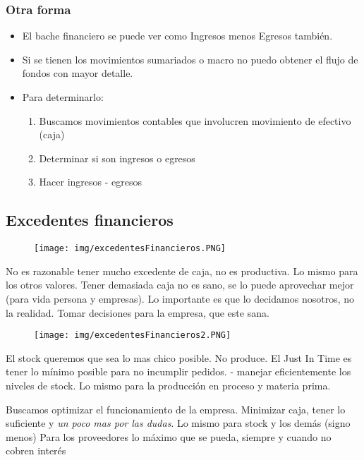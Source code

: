 \documentclass[titlepage,a4paper]{article}
\begin{document}
\subsubsection*{Otra forma}
\begin{itemize}
    \item El bache financiero se puede ver como Ingresos menos Egresos también.
    \item Si se tienen los movimientos sumariados o macro no puedo obtener el flujo de fondos con mayor detalle.
    \item Para determinarlo:
    \begin{enumerate}
        \item Buscamos movimientos contables que involucren movimiento de efectivo (caja)
        \item Determinar si son ingresos o egresos
        \item Hacer ingresos - egresos
    \end{enumerate}
\end{itemize}


\newpage
\subsection{Excedentes financieros}

\begin{figure}[!htb]
    \centering
    \texttt{[image: img/excedentesFinancieros.PNG]}
\end{figure}

No es razonable tener mucho excedente de caja, no es productiva. Lo mismo para los otros valores. 
Tener demasiada caja no es sano, se lo puede aprovechar mejor (para vida persona y empresas).
Lo importante es que lo decidamos nosotros, no la realidad. Tomar decisiones para la empresa, que este sana.

\begin{figure}[!htb]
    \centering
    \texttt{[image: img/excedentesFinancieros2.PNG]}
\end{figure}


El stock queremos que sea lo mas chico posible. No produce.
El Just In Time es tener lo mínimo posible para no incumplir pedidos. - manejar eficientemente los niveles de stock.
Lo mismo para la producción en proceso y materia prima.

Buscamos optimizar el funcionamiento de la empresa.
Minimizar caja, tener lo suficiente y \textit{un poco mas por las dudas}. Lo mismo para stock y los demás (signo menos)
Para los proveedores lo máximo que se pueda, siempre y cuando no cobren interés
\end{document}
